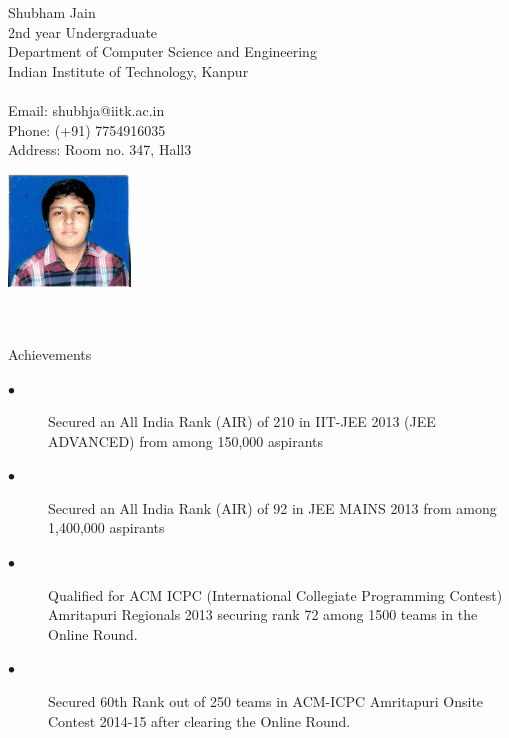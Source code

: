 \documentclass{article}
\begin{document}
\begin{minipage}{0.45\textwidth}
{\Large Shubham Jain}
\\ 2nd year Undergraduate
\\ Department of Computer Science and Engineering 
\\ Indian Institute of Technology, Kanpur
\\
\\ Email: shubhja@iitk.ac.in
\\  Phone: (+91) 7754916035
\\  Address: Room no. 347, Hall3
\end{minipage}
\begin{minipage}{0.45\textwidth}
\hfill{\includegraphics[height=3cm]{Photo}}
\end{minipage}
\\ \vspace{5 mm}
\\  
{\large Achievements}
\begin{description}
 \item[$\bullet $] Secured an All India Rank (AIR) of 210 in IIT-JEE 2013 (JEE ADVANCED) from among 150,000 aspirants
 \item[$\bullet $] Secured an All India Rank (AIR) of 92 in JEE MAINS 2013 from among 1,400,000 aspirants
 \item[$\bullet $] Qualified for ACM ICPC (International Collegiate Programming Contest) Amritapuri Regionals 2013 securing rank 72 among 1500 teams in the Online Round.
 \item[$\bullet $] Secured 60th Rank out of 250 teams in ACM-ICPC Amritapuri Onsite Contest 2014-15 after clearing the Online Round.
\end{description}
\end{document}
